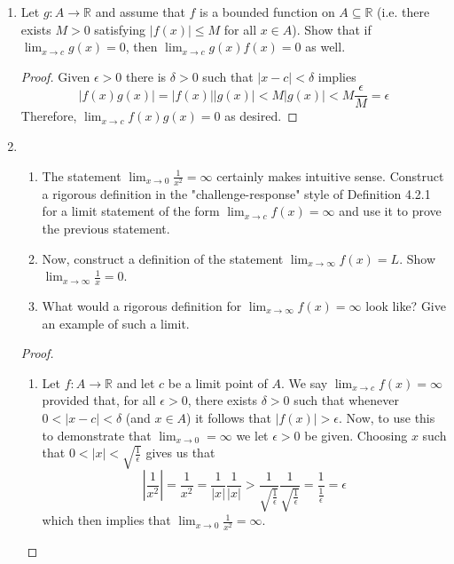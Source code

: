 \begin{enumerate}
    \item Let \( g: A \rightarrow \mathbb{R} \) and assume that \( f \) is a bounded function on \( A \subseteq \mathbb{R} \) (i.e. there exists \( M > 0 \) satisfying \( \vert f(x) \vert \leq M \) for all \( x \in A \)). Show that if \( \lim_{x \rightarrow c} g(x) = 0 \), then \( \lim_{x \rightarrow c} g(x)f(x) = 0 \) as well. 
    
    \begin{proof}
    Given \( \epsilon > 0 \) there is \( \delta > 0 \) such that \( \vert x-c \vert < \delta \) implies
    \[
    \vert f(x) g(x) \vert = \vert f(x) \vert \vert g(x) \vert < M \vert g(x) \vert < M \frac{\epsilon}{M} = \epsilon
    \]
    Therefore, \( \lim_{x \rightarrow c} f(x)g(x) = 0 \) as desired.
    \end{proof}
    
    \item \begin{enumerate}
        \item The statement \( \lim_{ x \rightarrow 0 } \frac{1}{x^{2}} = \infty \) certainly makes intuitive sense. Construct a rigorous definition in the "challenge-response" style of Definition 4.2.1 for a limit statement of the form \( \lim_{x \rightarrow c} f(x) = \infty \) and use it to prove the previous statement.
        
        \item Now, construct a definition of the statement \( \lim_{x \rightarrow \infty} f(x) = L \). Show \( \lim_{x \rightarrow \infty} \frac{1}{x} = 0 \).
        
        \item What would a rigorous definition for \( \lim_{x \rightarrow \infty} f(x) = \infty \) look like? Give an example of such a limit.
    \end{enumerate}
    
    \begin{proof}
    \begin{enumerate}
        \item Let \( f: A \rightarrow \mathbb{R} \) and let \( c \) be a limit point of \( A \). We say \( \lim_{x \rightarrow c} f(x) = \infty \) provided that, for all \( \epsilon > 0 \), there exists \( \delta > 0 \) such that whenever \( 0 < \vert x - c \vert < \delta \) (and \( x \in A \)) it follows that \( \vert f(x) \vert > \epsilon \). Now, to use this to demonstrate that \( \lim_{ x \rightarrow 0} = \infty \) we let \( \epsilon > 0 \) be given. Choosing \( x \) such that \( 0 < \vert x \vert < \sqrt{\frac{1}{\epsilon}} \) gives us that
        \[
        \left| \frac{1}{x^{2}} \right| = \frac{1}{x^{2}} = \frac{1}{\vert x \vert} \frac{1}{\vert x \vert} > \frac{1}{\sqrt{\frac{1}{\epsilon}}} \frac{1}{\sqrt{\frac{1}{\epsilon}}} = \frac{1}{\frac{1}{\epsilon}} = \epsilon 
        \]
        which then implies that \( \lim_{ x \rightarrow 0} \frac{1}{x^{2}} = \infty \).
        

\end{enumerate}
\end{proof}
\end{enumerate}
